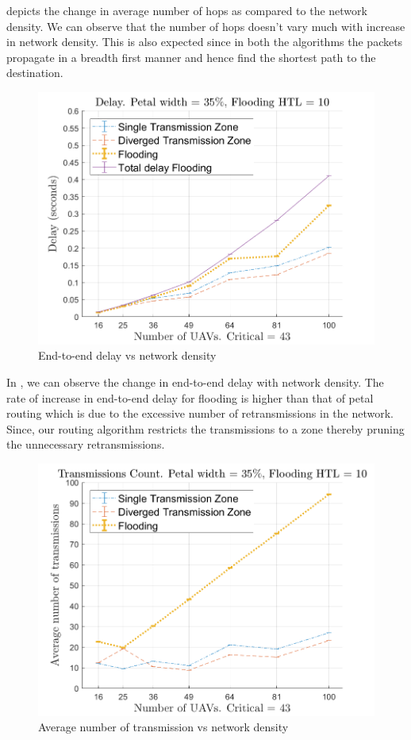  depicts the change in average number of hops as compared to the network density. We can observe that the number of hops doesn't vary much with increase in network density. This is also expected since in both the algorithms the packets propagate in a breadth first manner and hence find the shortest path to the destination. 

\begin{figure}[hbtp]
\centering
\includegraphics[width=\simResultFigSize\textwidth]{ncsuthesis-0.6/Chapter-5/figs/ND_delay}
\caption{End-to-end delay vs network density}
\label{fig:ND_delay}
\end{figure}

In , we can observe the change in end-to-end delay with network density. The rate of increase in end-to-end delay for flooding is higher than that of petal routing which is due to the excessive number of retransmissions in the network. Since, our routing algorithm restricts the transmissions to a zone thereby pruning the unnecessary retransmissions.  

\begin{figure}[hbtp]
\centering
\includegraphics[width=\simResultFigSize\textwidth]{ncsuthesis-0.6/Chapter-5/figs/ND_trans}
\caption{Average number of transmission vs network density}
\label{fig:ND_trans}
\end{figure}

